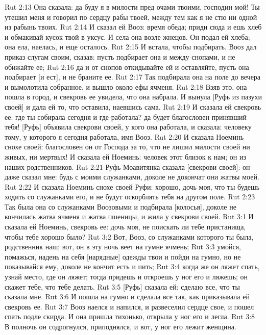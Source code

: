 \vs Rut 2:13 Она сказала: да буду я в милости пред очами твоими, господин мой! Ты утешил меня и говорил по сердцу рабы твоей, между тем как я не стю ни одной из рабынь твоих.
\vs Rut 2:14 И сказал ей Вооз: время обеда; приди сюда и ешь хлеб и обмакивай кусок твой в уксус. И села она возле жнецов. Он подал ей хлеба; она ела, наелась, и еще осталось.
\vs Rut 2:15 И встала, чтобы подбирать. Вооз дал приказ слугам своим, сказав: пусть подбирает она и между снопами, и не обижайте ее;
\vs Rut 2:16 да и от снопов откидывайте ей и оставляйте, пусть она подбирает [и ест], и не браните ее.
\vs Rut 2:17 Так подбирала она на поле до вечера и вымолотила собранное, и вышло около ефы ячменя.
\vs Rut 2:18 Взяв это, она пошла в город, и свекровь ее увидела, что она набрала. И вынула [Руфь из пазухи своей] и дала ей то, что оставила, наевшись сама.
\vs Rut 2:19 И сказала ей свекровь ее: где ты собирала сегодня и где работала? да будет благословен принявший тебя! [Руфь] объявила свекрови своей, у кого она работала, и сказала: человеку тому, у которого я сегодня работала, имя Вооз.
\vs Rut 2:20 И сказала Ноеминь снохе своей: благословен он от Господа за то, что не лишил милости своей ни живых, ни мертвых! И сказала ей Ноеминь: человек этот близок к нам; он из наших родственников.
\vs Rut 2:21 Руфь Моавитянка сказала [свекрови своей]: он даже сказал мне: будь с моими служанками, доколе не докончат они жатвы моей.
\vs Rut 2:22 И сказала Ноеминь снохе своей Руфи: хорошо, дочь моя, что ты будешь ходить со служанками его, и не будут оскорблять тебя на другом поле.
\vs Rut 2:23 Так была она со служанками Воозовыми и подбирала [колосья], доколе не кончилась жатва ячменя и жатва пшеницы, и жила у свекрови своей.
\vs Rut 3:1 И сказала ей Ноеминь, свекровь ее: дочь моя, не поискать ли тебе пристанища, чтобы тебе хорошо было?
\vs Rut 3:2 Вот, Вооз, со служанками которого ты была, родственник наш; вот, он в эту ночь веет на гумне ячмень;
\vs Rut 3:3 умойся, помажься, надень на себя [нарядные] одежды твои и пойди на гумно, но не показывайся ему, доколе не кончит есть и пить;
\vs Rut 3:4 когда же он ляжет спать, узнай место, где он ляжет; тогда придешь и откроешь у ног его и ляжешь; он скажет тебе, что тебе делать.
\vs Rut 3:5 [Руфь] сказала ей: сделаю все, что ты сказала мне.
\vs Rut 3:6 И пошла на гумно и сделала все так, как приказывала ей свекровь ее.
\vs Rut 3:7 Вооз наелся и напился, и развеселил сердце свое, и пошел  спать подле скирда. И она пришла тихонько, открыла у ног его и легла.
\vs Rut 3:8 В полночь он содрогнулся, приподнялся, и вот, у ног его лежит женщина.
